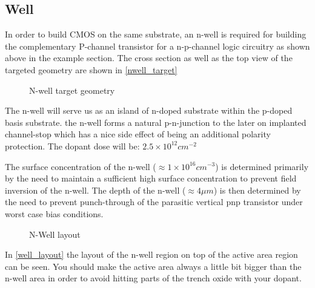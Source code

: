 \subsection{Well}\label{well}
In order to build CMOS on the same substrate, an n-well is required for building the complementary P-channel transistor for a n-p-channel logic circuitry as shown above in the example section.
The cross section as well as the top view of the targeted geometry are shown in \autoref{nwell_target}
\begin{figure}[H]
	\centering
	\begin{tikzpicture}[node distance = 3cm, auto, thick,scale=\CrossAndTopSectionBig, every node/.style={transform shape}]
		
	\end{tikzpicture}
	\begin{tikzpicture}[node distance = 3cm, auto, thick,scale=\CrossAndTopSectionBig, every node/.style={transform shape}]
		
	\end{tikzpicture}
	\caption{N-well target geometry}
	\label{nwell_target}
\end{figure}
The n-well will serve us as an island of n-doped substrate within the p-doped basis substrate.
the n-well forms a natural p-n-junction to the later on implanted channel-stop which has a nice side effect of being an additional polarity protection.
The dopant dose will be: $2.5\times10^{12}cm^{-2}$

The surface concentration of the n-well ($\approx 1 \times 10^{16} cm^{-3}$) is determined primarily by the need to maintain a sufficient high surface concentration to prevent field inversion of the n-well.
The depth of the n-well ($\approx 4 \mu m$) is then determined by the need to prevent punch-through of the parasitic vertical pnp transistor under worst case bias conditions.

\begin{figure}[H]
	\centering
	\begin{tikzpicture}[node distance =1cm, auto, thick,scale=\VLSILayout, every node/.style={transform shape}]
		
	\end{tikzpicture}
	\caption{N-Well layout}
	\label{well_layout}
\end{figure}

In \autoref{well_layout} the layout of the n-well region on top of the active area region can be seen.
You should make the active area always a little bit bigger than the n-well area in order to avoid hitting parts of the trench oxide with your dopant.

